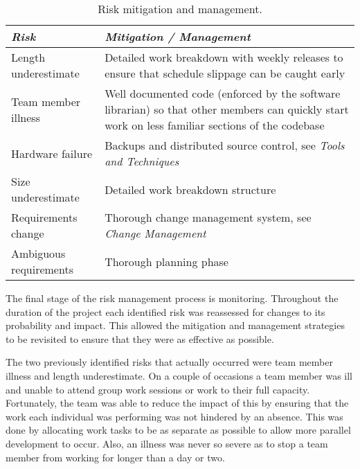 \begin{table*}
	\small
	\begin{tabular}{l p{37em}}
		\toprule
		\emph{Risk} & \emph{Mitigation / Management} \\
		\midrule
		Length underestimate & Detailed work breakdown with weekly releases to ensure that
			schedule slippage can be caught early \\
		Team member illness & Well documented code (enforced by the software librarian) so
			that other members can quickly start work on less familiar sections of
			the codebase \\
		Hardware failure & Backups and distributed source control, see \emph{Tools and Techniques} \\ %
		Size underestimate & Detailed work breakdown structure \\
		Requirements change & Thorough change management system, see \emph{Change Management} \\ %
		Ambiguous requirements & Thorough planning phase \\
		\bottomrule
	\end{tabular}
	\vspace{1.5em}
	\caption{Risk mitigation and management.}
	\label{tab:rmm}
\end{table*}

The final stage of the risk management process is monitoring. Throughout the duration of
the project each identified risk was reassessed for changes to its probability and
impact. This allowed the mitigation and management strategies to be revisited to ensure that
they were as effective as possible.

The two previously identified risks that actually occurred were team member illness and length underestimate.
On a couple of occasions a team member was ill and unable to attend group work sessions or work to their full
capacity. Fortunately, the team was able to reduce the impact of this by ensuring that the work each individual
was performing was not hindered by an absence. This was done by allocating work tasks to be as separate as
possible to allow more parallel development to occur. Also, an illness was never so severe as to stop a team
member from working for longer than a day or two.

